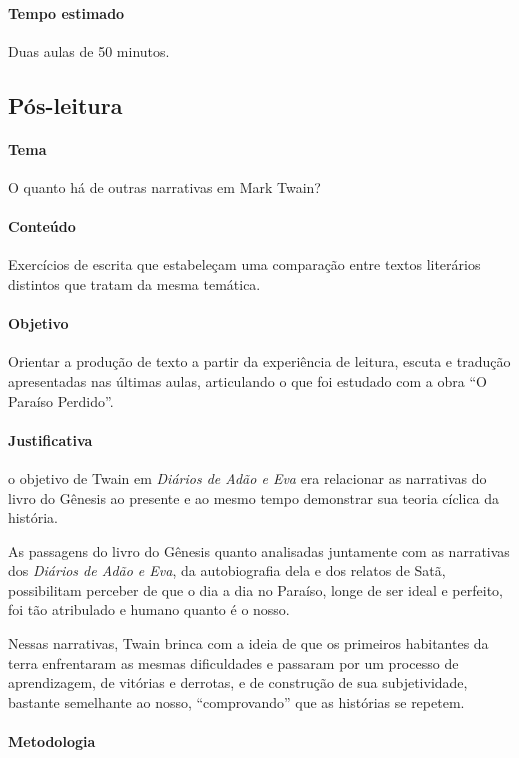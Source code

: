 \documentclass[12pt]{extarticle}
\begin{document}
\paragraph{Tempo estimado} Duas aulas de 50 minutos. 


\subsection{Pós-leitura}

\paragraph{Tema} O quanto há de outras narrativas em Mark Twain?

\paragraph{Conteúdo} Exercícios de escrita que estabeleçam uma comparação entre 
textos literários distintos que tratam da mesma temática.

\paragraph{Objetivo} Orientar a produção de texto a partir da experiência
de leitura, escuta e tradução apresentadas nas últimas
aulas, articulando o que foi estudado com a obra ``O Paraíso Perdido''.

\paragraph{Justificativa} o objetivo de Twain em \emph{Diários de Adão e Eva} era
relacionar as narrativas do livro do Gênesis ao presente e
ao mesmo tempo demonstrar sua teoria cíclica da história. 

As passagens do livro do Gênesis quanto analisadas juntamente com 
as narrativas dos \emph{Diários de Adão e Eva}, da autobiografia
dela e dos relatos de Satã, possibilitam perceber de que o dia a dia
no Paraíso, longe de ser ideal e perfeito, foi tão atribulado e
humano quanto é o nosso. 

Nessas narrativas, Twain brinca
com a ideia de que os primeiros habitantes da terra enfrentaram
as mesmas dificuldades e passaram por um processo
de aprendizagem, de vitórias e derrotas, e de construção de
sua subjetividade, bastante semelhante ao nosso, 
``comprovando'' que as histórias se repetem.  

\paragraph{Metodologia}
\end{document}
